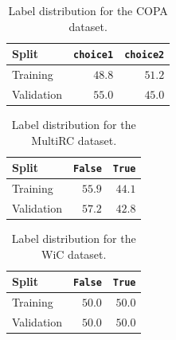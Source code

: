 \documentclass[11pt]{article}
\begin{document}
\begin{table}[t]
    \centering
    \footnotesize
    \caption{Label distribution for the CB dataset.}
    \label{tab:cb-label-dist}
\end{table}

\begin{table}[t]
    \centering
    \footnotesize
    \begin{tabular}{l| r r}
    \toprule
    Split & {\tt choice1} & {\tt choice2} \\
    \midrule
    Training & $48.8$ & $51.2$ \\
    Validation & $55.0$ & $45.0$ \\
    \bottomrule
    \end{tabular}
    \caption{Label distribution for the COPA dataset.}
    \label{tab:copa-label-dist}
\end{table}

\begin{table}[t]
    \centering
    \footnotesize
    \begin{tabular}{l| r r}
    \toprule
    Split & {\tt False} & {\tt True} \\
    \midrule
    Training & $55.9$ & $44.1$ \\
    Validation & $57.2$ & $42.8$ \\
    \bottomrule
    \end{tabular}
    \caption{Label distribution for the MultiRC dataset.}
    \label{tab:multirc-label-dist}
\end{table}

\begin{table}[t]
    \centering
    \footnotesize
    \begin{tabular}{l | r r}
    \toprule
    Split & {\tt False} & {\tt True} \\
    \midrule
    Training & $50.0$ & $50.0$ \\
    Validation & $50.0$ & $50.0$ \\
    \bottomrule
    \end{tabular}
    \caption{Label distribution for the WiC dataset.}
    \label{tab:wic-label-dist}
\end{table}
\end{document}
